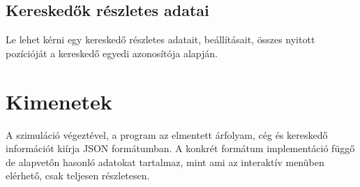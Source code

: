\documentclass{article}[12pt,a4paper]
\begin{document}
    \subsection{Kereskedők részletes adatai}
    Le lehet kérni egy kereskedő részletes adatait, beállításait, összes nyitott pozícióját a kereskedő egyedi azonosítója alapján.


    \section{Kimenetek}
    A szimuláció végeztével, a program az elmentett árfolyam, cég és kereskedő információt kiírja JSON formátumban.
    A konkrét formátum implementáció függő de alapvetőn hasonló adatokat tartalmaz, mint ami az interaktív menüben elérhető, csak teljesen részletesen.
\end{document}
